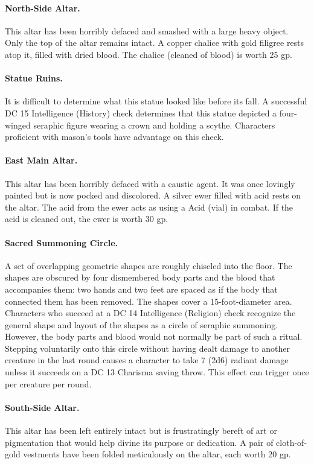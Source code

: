 \documentclass[10pt,a4paper,twoside,twocolumn,openany,bg=print,nodeprecatedcode]{dndbook}
\begin{document}
\paragraph{North-Side Altar.}
This altar has been horribly defaced and smashed with a large heavy object. Only the top of the altar remains intact. A copper chalice with gold filigree rests atop it, filled with dried blood. The chalice (cleaned of blood) is worth 25 gp.
\paragraph{Statue Ruins.}
It is difficult to determine what this statue looked like before its fall. A successful DC 15 Intelligence (History) check determines that this statue depicted a four-winged seraphic figure wearing a crown and holding a scythe. Characters proficient with mason's tools have advantage on this check.
\paragraph{East Main Altar.}
This altar has been horribly defaced with a caustic agent. It was once lovingly painted but is now pocked and discolored. A silver ewer filled with acid rests on the altar. The acid from the ewer acts as using a Acid (vial) in combat. If the acid is cleaned out, the ewer is worth 30 gp.
\paragraph{Sacred Summoning Circle.}
A set of overlapping geometric shapes are roughly chiseled into the floor. The shapes are obscured by four dismembered body parts and the blood that accompanies them: two hands and two feet are spaced as if the body that connected them has been removed. The shapes cover a 15-foot-diameter area. Characters who succeed at a DC 14 Intelligence (Religion) check recognize the general shape and layout of the shapes as a circle of seraphic summoning. However, the body parts and blood would not normally be part of such a ritual. Stepping voluntarily onto this circle without having dealt damage to another creature in the last round causes a character to take 7 (2d6) radiant damage unless it succeeds on a DC 13 Charisma saving throw. This effect can trigger once per creature per round.
\paragraph{South-Side Altar.}
This altar has been left entirely intact but is frustratingly bereft of art or pigmentation that would help divine its purpose or dedication. A pair of cloth-of-gold vestments have been folded meticulously on the altar, each worth 20 gp.
\end{document}
